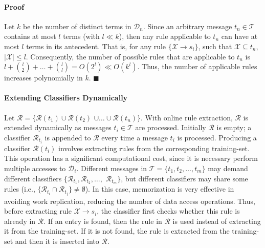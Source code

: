 \paragraph*{\bf{Proof}}
Let $k$ be the number of distinct terms in
$\mathcal{D}_n$.
Since an arbitrary message $t_n\in\mathcal{T}$ contains at most $l$
terms (with $l\ll k$), then any rule applicable to $t_n$
can have at most $l$ terms in its antecedent. That is, for any
rule $\{\mathcal{X}\xrightarrow{}s_i\}$, such that $\mathcal{X}\subseteq t_n$,
$|\mathcal{X}|\le l$. Consequently, the number of
possible rules that are applicable to $t_n$ is
$l+{{l}\choose{2}}+\ldots+{{l}\choose{l}}=O(2^l)\ll O(k^l)$.
Thus, the number of applicable rules increases
polynomially in $k$.
$\blacksquare$\\

\paragraph*{\bf{Extending Classifiers Dynamically}}
Let $\mathcal{R}=\{\mathcal{R}(t_1)\cup\mathcal{R}(t_2)$ $\cup\ldots\cup\mathcal{R}(t_n)\}$.
With online rule extraction, 
$\mathcal{R}$ is extended dynamically as messages $t_i\in\mathcal{T}$ are processed. Initially $\mathcal{R}$ is empty; a classifier $\mathcal{R}_{t_i}$ is appended to $\mathcal{R}$ every time a message $t_i$ is processed.
Producing a classifier $\mathcal{R}(t_i)$ involves extracting rules from the corresponding training-set. This operation has a significant computational cost, since it is necessary perform multiple accesses to $\mathcal{D}_i$.
Different messages in $\mathcal{T}=\{t_1, t_2, \ldots, t_m\}$ may demand different classifiers $\{\mathcal{R}_{t_1}, \mathcal{R}_{t_2}, \ldots,$ $\mathcal{R}_{t_m}\}$,
but different classifiers may share some rules (i.e., $\{\mathcal{R}_{t_i}\cap\mathcal{R}_{t_j}\}\ne\emptyset$).
In this case,
memorization is very effective in avoiding work replication,
reducing the number of data access operations.
Thus, before extracting
rule $\mathcal{X}\xrightarrow{}s_i$, the classifier first checks whether this rule is
already in $\mathcal{R}$. If an entry is found, then the rule
in $\mathcal{R}$ is used instead of extracting it from the training-set. If it is not found, the rule is
extracted from the training-set and then it is inserted into $\mathcal{R}$.

